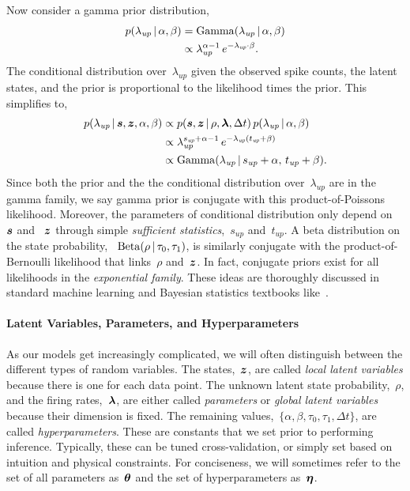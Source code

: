 Now consider a gamma prior distribution,
\begin{align}
  p(\lambda_{\textit{up}} \,|\, \alpha, \beta)
  &= \mathrm{Gamma}(\lambda_{\textit{up}} \,|\, \alpha, \beta) \\
  &\propto \lambda_{\textit{up}}^{\alpha - 1} \,
  e^{-\lambda_{\textit{up}} \cdot \beta}.
\end{align}
The conditional distribution over~$\lambda_{\textit{up}}$ given the
observed spike counts, the latent states, and the prior is
proportional to the likelihood times the prior. This simplifies to,
\begin{align}
  p(\lambda_{\textit{up}} \,|\, \boldsymbol{s}, \boldsymbol{z}, \alpha, \beta)
  &\propto p(\boldsymbol{s}, \boldsymbol{z} \,|\, \rho, \boldsymbol{\lambda}, \Delta t) \,
  p(\lambda_{\textit{up}} \,|\, \alpha, \beta) \\
  &\propto \lambda_{\textit{up}}^{s_{\textit{up}} + \alpha - 1} \,
  e^{-\lambda_{\textit{up}} (t_{\textit{up}} +\beta)} \\
  &\propto \mathrm{Gamma}(\lambda_{\textit{up}} \,|\,
  s_{\textit{up}} + \alpha, \,
  t_{\textit{up}} + \beta).
\end{align}
Since both the prior and the the conditional distribution
over~$\lambda_{\textit{up}}$ are in the gamma family, we say gamma
prior is conjugate with this product-of-Poissons likelihood.
Moreover, the parameters of
conditional distribution only depend on~$\boldsymbol{s}$ and ~$\boldsymbol{z}$ through
simple \emph{sufficient statistics},~$s_{\textit{up}}$
and~$t_{\textit{up}}$. A beta distribution on the state probability,
~${\mathrm{Beta}(\rho \,|\, \tau_0, \tau_1)}$, is similarly conjugate
with the product-of-Bernoulli likelihood that links~$\rho$ and~$\boldsymbol{z}$.
In fact,
conjugate priors exist for all likelihoods in the \emph{exponential
  family}. These ideas are thoroughly discussed in standard machine
learning and Bayesian statistics textbooks like~\citet{Murphy-2012}.


\paragraph{Latent Variables, Parameters, and Hyperparameters}
As our models get increasingly complicated, we will often distinguish
between the different types of random variables. The states,~$\boldsymbol{z}$,
are called \emph{local latent variables} because there is one for each
data point.  The unknown latent state probability,~$\rho$, and the
firing rates,~$\boldsymbol{\lambda}$, are either called \emph{parameters} or
\emph{global latent variables} because their dimension is fixed. The
remaining values,~${\{ \alpha, \beta, \tau_0, \tau_1, \Delta t \} }$,
are called \emph{hyperparameters}. These are constants that we set
prior to performing inference.  Typically, these can be tuned
cross-validation, or simply set based on intuition and physical
constraints. For conciseness, we will sometimes refer to the set of
all parameters as~$\boldsymbol{\theta}$ and the set of hyperparameters
as~$\boldsymbol{\eta}$.


